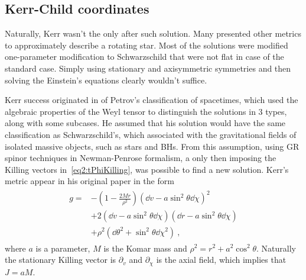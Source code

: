 \subsection{Kerr-Child coordinates}

Naturally, Kerr wasn't the only after such solution.
Many presented other metrics to approximately describe a rotating star. 
Most of the solutions were modified one-parameter modification to Schwarzschild that were not flat in case of the standard case. 
Simply using stationary and axisymmetric symmetries and then solving the Einstein's equations clearly wouldn't suffice.

Kerr success originated in of Petrov's classification of spacetimes, which used the algebraic properties of the Weyl tensor to distinguish the solutions in 3 types, along with some subcases.
He assumed that his solution would have the same classification as Schwarzschild's, which associated with the gravitational fields of isolated massive objects, such as stars and BHs. 
From this assumption, using GR spinor techniques in Newman-Penrose formalism, a only then imposing the Killing vectors in~\eqref{eq2:tPhiKilling}, was possible to find a new solution. 
Kerr's metric appear in his original paper in the form
\begin{align}
    \begin{split}
        g = &- \left(1 - \frac{2 M r}{\rho^2} \right) (\dd v - a \sin^2\theta \dd \chi )^2 \\
        &+ 2  (\dd v - a \sin^2\theta \dd \chi )  (\dd r - a \sin^2\theta \dd \chi ) \\
        &+ \rho^2 (\dd \theta^2 + \sin^2\theta \dd \chi^2 ) ~,
    \end{split}
    \label{eq2:KerrIngoingEF}
\end{align}
where $a$ is a parameter, $M$ is the Komar mass and $\rho^2 = r^2 + a^2 \cos^2\theta$. Naturally the stationary Killing vector is $\partial_v$ and $\partial_\chi$ is the axial field, which implies that $J = a M$.

